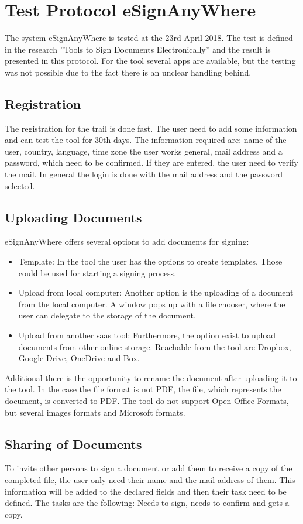 \section{Test Protocol eSignAnyWhere}
\label{sec:signAny}
The system eSignAnyWhere is tested at the 23rd April 2018. The test is defined in the research ''Tools to Sign Documents Electronically'' and the result is presented in this protocol. For the tool several \glspl{app} are available, but the testing was not possible due to the fact there is an unclear handling behind.

\subsection{Registration}
The registration for the trail is done fast. The user need to add some information and can test the tool for 30th days. The information required are: name of the user, country, language, time zone the user works general, mail address and a password, which need to be confirmed. If they are entered, the user need to verify the mail.
In general the login is done with the mail address and the password selected.

\subsection{Uploading Documents}
eSignAnyWhere offers several options to add documents for signing:
\begin{itemize}
	\item Template: In the tool the user has the options to create templates. Those could be used for starting a signing process.
	\item Upload from local computer: Another option is the uploading of a document from the local computer. A window pops up with a file chooser, where the user can delegate to the storage of the document. 
	\item Upload from another \gls{saas} tool: Furthermore, the option exist to upload documents from other online storage. Reachable from the tool are Dropbox, Google Drive, OneDrive and Box.
\end{itemize}
Additional there is the opportunity to rename the document after uploading it to the tool. In the case the file format is not \gls{PDF}, the file, which represents the document, is converted to \gls{PDF}. The tool do not support Open Office Formats, but several images formats and Microsoft formats.

\subsection{Sharing of Documents}
To invite other persons to sign a document or add them to receive a copy of the completed file, the user only need their name and the mail address of them. This information will be added to the declared fields and then their task need to be defined. The tasks are the following: Needs to sign, needs to confirm and gets a copy.

